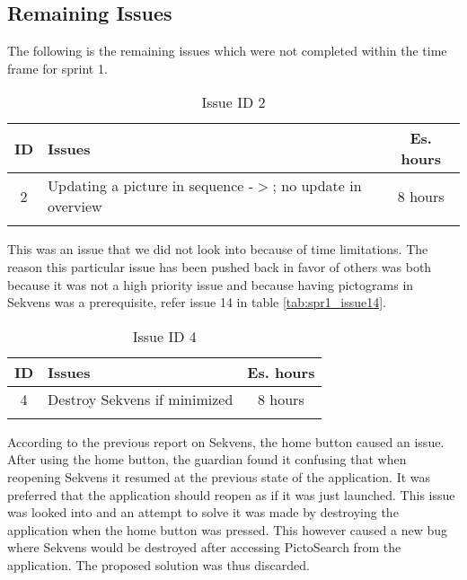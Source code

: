 \subsection{Remaining Issues}\label{subsec:remain_issues}
The following is the remaining issues which were not completed within the time frame for sprint 1.

\begin{longtable} { | c | p{12cm} | c | } 
\hline
	ID 	&	Issues	&		 Es. hours \\\hline
	2	&	Updating a picture in sequence -$>$; no update in overview	&	8 hours	\\\hline
	\caption{Issue ID 2}
\label{tab:spr1_overviewupdate}
\end{longtable}
This was an issue that we did not look into because of time limitations. The reason this particular issue has been pushed back in favor of others was both because it was not a high priority issue and because having pictograms in Sekvens was a prerequisite, refer issue 14 in table \ref{tab:spr1_issue14}. 

\begin{longtable} { | c | p{12cm} | c | } 
\hline
	ID 	&	Issues	&		 Es. hours \\\hline
	4	&	Destroy Sekvens if minimized 	&	8 hours	\\\hline
	\caption{Issue ID 4}
\label{tab:spr1_homebtndestroy}
\end{longtable}

According to the previous report on Sekvens\citep{Zebra}, the home button caused an issue. After using the home button, the guardian found it confusing that when reopening Sekvens it resumed at the previous state of the application. It was preferred that the application should reopen as if it was just launched. This issue was looked into and an attempt to solve it was made by destroying the application when the home button was pressed. This however caused a new bug where Sekvens would be destroyed after accessing PictoSearch from the application. The proposed solution was thus discarded.